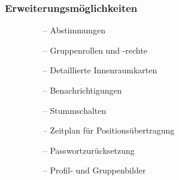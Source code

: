 \documentclass[aspectratio=1610]{beamer}
\begin{document}
  \begin{frame}[plain]
      \frametitle{\textbf{Erweiterungsmöglichkeiten}}
		\begin{minipage}{0.45\textwidth}%
            \begin{figure}%
                \begin{itemize}
                \item[--] Abstimmungen
                \item[--] Gruppenrollen und -rechte
                \item[--] Detaillierte Innenraumkarten
                \item[--] Benachrichtigungen
                \item[--] Stummschalten
                \item[--] Zeitplan für Positionsübertragung
                \item[--] Passwortzurücksetzung
                \item[--] Profil- und Gruppenbilder
                \end{itemize}%
            \end{figure}%
		\end{minipage}%
        \hspace{.05\textwidth}%
\end{frame}
\end{document}
